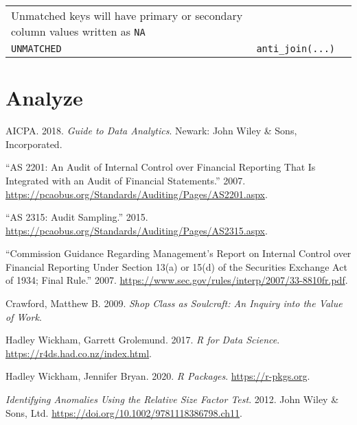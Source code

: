 \documentclass[
]{book}
\begin{document}
\begin{longtable}[]{@{}lll@{}}
\begin{minipage}[t]{0.30\columnwidth}
Unmatched keys will have primary or secondary column values written as \texttt{NA}\strut
\end{minipage}\tabularnewline
\begin{minipage}[t]{0.30\columnwidth}\raggedright
\texttt{UNMATCHED}\strut
\end{minipage} & \begin{minipage}[t]{0.30\columnwidth}\raggedright
\texttt{anti\_join(...)}\strut
\end{minipage} & \begin{minipage}[t]{0.30\columnwidth}\raggedright
\strut
\end{minipage}\tabularnewline
\bottomrule
\end{longtable}

\hypertarget{analyze}{%
\section{Analyze}\label{analyze}}

\hypertarget{refs}{}
\leavevmode\hypertarget{ref-aicpa2018guide}{}%
AICPA. 2018. \emph{Guide to Data Analytics}. Newark: John Wiley \& Sons, Incorporated.

\leavevmode\hypertarget{ref-pcaob-as2201}{}%
``AS 2201: An Audit of Internal Control over Financial Reporting That Is Integrated with an Audit of Financial Statements.'' 2007. \url{https://pcaobus.org/Standards/Auditing/Pages/AS2201.aspx}.

\leavevmode\hypertarget{ref-pcaob-as2315}{}%
``AS 2315: Audit Sampling.'' 2015. \url{https://pcaobus.org/Standards/Auditing/Pages/AS2315.aspx}.

\leavevmode\hypertarget{ref-sec-princples-based}{}%
``Commission Guidance Regarding Management's Report on Internal Control over Financial Reporting Under Section 13(a) or 15(d) of the Securities Exchange Act of 1934; Final Rule.'' 2007. \url{https://www.sec.gov/rules/interp/2007/33-8810fr.pdf}.

\leavevmode\hypertarget{ref-shop-class}{}%
Crawford, Matthew B. 2009. \emph{Shop Class as Soulcraft: An Inquiry into the Value of Work}.

\leavevmode\hypertarget{ref-rfordatasci}{}%
Hadley Wickham, Garrett Grolemund. 2017. \emph{R for Data Science}. \url{https://r4ds.had.co.nz/index.html}.

\leavevmode\hypertarget{ref-r-pkgs}{}%
Hadley Wickham, Jennifer Bryan. 2020. \emph{R Packages}. \url{https://r-pkgs.org}.

\leavevmode\hypertarget{ref-nigrini-forensicanalytics-ch11}{}%
\emph{Identifying Anomalies Using the Relative Size Factor Test}. 2012. John Wiley \& Sons, Ltd. \url{https://doi.org/10.1002/9781118386798.ch11}.
\end{document}
